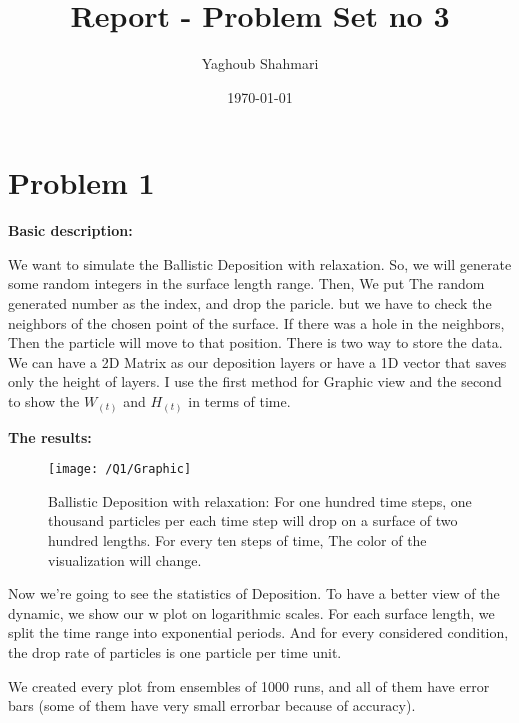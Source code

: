 \documentclass{article}
\author{Yaghoub Shahmari}
\title{Report - Problem Set no 3}
\date{\today}
\begin{document}
    \maketitle
    \section*{Problem 1}
    \textbf{Basic description:}

    We want to simulate the Ballistic Deposition with relaxation.
    So, we will generate some random integers in the surface length range.
    Then, We put The random generated number as the index, and drop the paricle.
    but we have to check the neighbors of the chosen point of the surface.
    If there was a hole in the neighbors, Then the particle will move to that position.
    There is two way to store the data. We can have a 2D Matrix as our deposition layers or have a 1D vector that saves only the height of layers.
    I use the first method for Graphic view and the second to show the $W_{(t)}$ and $H_{(t)}$ in terms of time.

    \textbf{The results:}

    \begin{figure}[!htb]
        \centering
        \texttt{[image: /Q1/Graphic]}
        \label{fig:1.1}
        \caption{Ballistic Deposition with relaxation:
        For one hundred time steps, one thousand particles per each time step will drop on a surface of two hundred lengths.
        For every ten steps of time, The color of the visualization will change.}
    \end{figure}

    \pagebreak

    Now we're going to see the statistics of Deposition.
    To have a better view of the dynamic,
    we show our w plot on logarithmic scales.
    For each surface length, we split the time range into exponential periods.
    And for every considered condition, the drop rate of particles is one particle per time unit.

    We created every plot from ensembles of 1000 runs,
    and all of them have error bars
    (some of them have very small errorbar because of accuracy).
\end{document}
